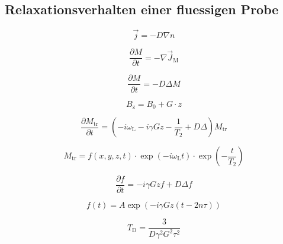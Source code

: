 \subsection{Relaxationsverhalten einer fluessigen Probe}%
\label{sub:relaxationsverhalten_einer_fluessigen_probe}

\begin{equation}
		\vec{j} = -D \nabla n	
\end{equation}

\begin{equation}
		\frac{\partial M}{\partial t} = - \nabla \vec{J}_\text{M}
\end{equation}


\begin{equation}
		\frac{\partial M}{\partial t} = - D \Delta M
\end{equation}

\begin{equation}
		\label{eq:gradB}
		B_\text{z} = B_0 + G \cdot z
\end{equation}

\begin{equation}
		\frac{\partial M_\text{tr}}{\partial t} = \left(- i \omega_\text{L} - i \gamma
Gz - \frac{1}{T_2} + D \Delta \right) M_\text{tr}
\end{equation}

\begin{equation}
		M_\text{tr} = f(x,y,z,t) \cdot \exp(-i\omega_\text{L}t) \cdot
		\exp\left(-\frac{t}{T_\text{2}}\right)
\end{equation}

\begin{equation}
		\frac{\partial f}{\partial t} = -i \gamma Gzf + D \Delta f
\end{equation}

\begin{equation}
		f(t) = A \exp \left( -i \gamma Gz ( t -2n\tau) \right)
\end{equation}

\begin{equation}
		T_\text{D} = \frac{3}{D \gamma^2 G^2 \tau^2}
\end{equation}

